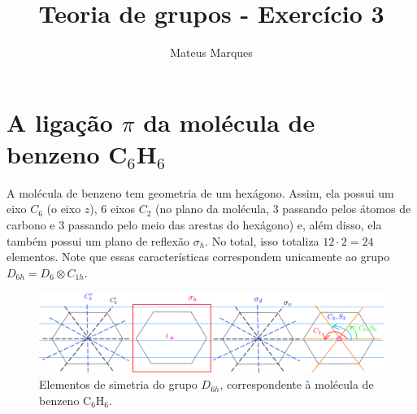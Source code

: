\documentclass[a4paper,10pt]{article}
\title{\Huge{\textbf{Teoria de grupos - Exercício 3}}}
\author{Mateus Marques}
\begin{document}
\maketitle

\section*{A ligação $\pi$ da molécula de benzeno C$_6$H$_6$}

A molécula de benzeno tem geometria de um hexágono. Assim, ela possui um eixo $C_6$ (o eixo $z$), 6 eixos $C_2$ (no plano da molécula, 3 passando pelos átomos de carbono e 3 passando pelo meio das arestas do hexágono) e, além disso, ela também possui um plano de reflexão $\sigma_h$. No total, isso totaliza $12 \cdot 2 = 24$ elementos. Note que essas características correspondem unicamente ao grupo $D_{6h} = D_6 \otimes C_{1h}$.

\begin{figure}[H]
\centering
\includegraphics[width=1.0\linewidth]{fig/D6h.png}
\caption{Elementos de simetria do grupo $D_{6h}$, correspondente à molécula de benzeno C$_6$H$_6$.}
\label{fig:D6h}
\end{figure}
\end{document}
